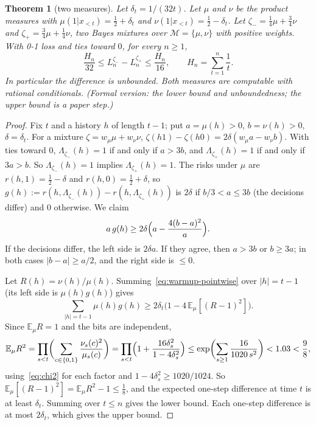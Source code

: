 \documentclass[11pt]{article}
\newcommand{\B}{\{0,1\}}
\newcommand{\E}{\mathbb{E}}
\newcommand{\cM}{\mathcal{M}}
\newtheorem{theorem}{Theorem}[section]
\theoremstyle{definition}
\theoremstyle{remark}
\begin{document}
\begin{theorem}[two measures]\label{thm:warmup}
Let $\delta_t=1/(32t)$. Let $\mu$ and $\nu$ be the product measures with
$\mu(1|x_{<t})=\frac12+\delta_t$ and $\nu(1|x_{<t})=\frac12-\delta_t$. Let
$\zeta_-=\frac14\mu+\frac34\nu$ and $\zeta_+=\frac34\mu+\frac14\nu$, two Bayes
mixtures over $\cM=\{\mu,\nu\}$ with positive weights. With 0-1 loss and ties
toward $0$, for every $n\ge1$,
\[
\frac{H_n}{32}\le L_n^{\zeta_-}-L_n^{\zeta_+}\le\frac{H_n}{16},
\qquad H_n=\sum_{t=1}^n\frac1t .
\]
In particular the difference is unbounded. Both measures are computable with
rational conditionals. (Formal version: the lower bound and unboundedness; the
upper bound is a paper step.)
\end{theorem}

\begin{proof}
Fix $t$ and a history $h$ of length $t-1$; put $a=\mu(h)>0$, $b=\nu(h)>0$,
$\delta=\delta_t$. For a mixture $\zeta=w_\mu\mu+w_\nu\nu$,
$\zeta(h1)-\zeta(h0)=2\delta(w_\mu a-w_\nu b)$. With ties toward 0,
$\Lambda_{\zeta_-}(h)=1$ if and only if $a>3b$, and $\Lambda_{\zeta_+}(h)=1$ if and
only if $3a>b$. So $\Lambda_{\zeta_-}(h)=1$ implies $\Lambda_{\zeta_+}(h)=1$. The
risks under $\mu$ are $r(h,1)=\frac12-\delta$ and $r(h,0)=\frac12+\delta$, so
$g(h):=r(h,\Lambda_{\zeta_-}(h))-r(h,\Lambda_{\zeta_+}(h))$ is $2\delta$ if
$b/3<a\le 3b$ (the decisions differ) and $0$ otherwise. We claim
\begin{equation}\label{eq:warmup-pointwise}
a\,g(h)\ge2\delta\Bigl(a-\frac{4(b-a)^2}{a}\Bigr).
\end{equation}
If the decisions differ, the left side is $2\delta a$. If they agree, then
$a>3b$ or $b\ge3a$; in both cases $|b-a|\ge a/2$, and the right side is
$\le0$.

Let $R(h)=\nu(h)/\mu(h)$. Summing~\eqref{eq:warmup-pointwise} over $|h|=t-1$
(its left side is $\mu(h)g(h)$) gives
\[
\sum_{|h|=t-1}\mu(h)g(h)\ge2\delta_t\bigl(1-4\,\E_\mu[(R-1)^2]\bigr).
\]
Since $\E_\mu R=1$ and the bits are independent,
\[
\E_\mu R^2=\prod_{s<t}\biggl(\sum_{c\in\B}\frac{\nu_s(c)^2}{\mu_s(c)}\biggr)
=\prod_{s<t}\Bigl(1+\frac{16\delta_s^2}{1-4\delta_s^2}\Bigr)
\le\exp\biggl(\sum_{s\ge1}\frac{16}{1020\,s^2}\biggr)<1.03<\frac98,
\]
using~\eqref{eq:chi2} for each factor and $1-4\delta_s^2\ge 1020/1024$.
So $\E_\mu[(R-1)^2]=\E_\mu R^2-1\le\frac18$, and the expected one-step
difference at time $t$ is at least $\delta_t$. Summing over $t\le n$ gives the
lower bound. Each one-step difference is at most $2\delta_t$, which gives the
upper bound.
\end{proof}
\end{document}
